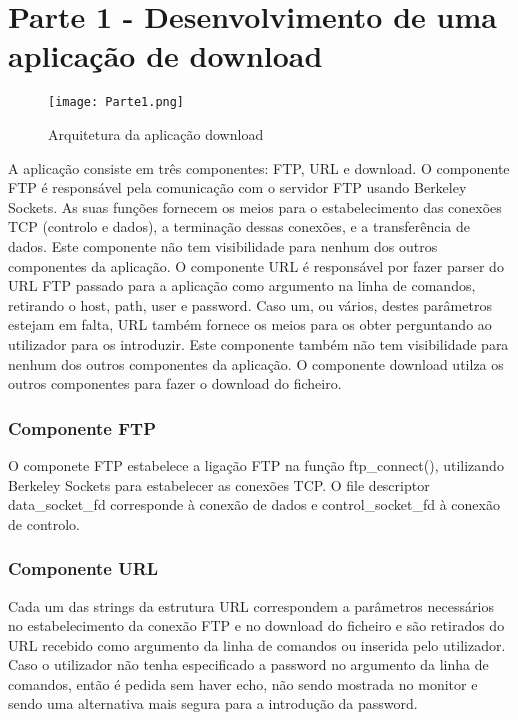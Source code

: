 \documentclass[a4paper]{article}
\begin{document}
\section{Parte 1 - Desenvolvimento de uma aplicação de download}

\begin{figure}[h]
    \centering
    \texttt{[image: Parte1.png]}
    \caption{Arquitetura da aplicação download}
\end{figure}


A aplicação consiste em três componentes: FTP, URL e download.
O componente FTP é responsável pela comunicação com o servidor FTP usando Berkeley Sockets. As suas funções fornecem os meios para o estabelecimento das conexões TCP (controlo e dados), a terminação dessas conexões, e a transferência de dados. Este componente não tem visibilidade para nenhum dos outros componentes da aplicação.
O componente URL é responsável por fazer parser do URL FTP passado para a aplicação como argumento na linha de comandos, retirando o host, path, user e password. Caso um, ou vários, destes parâmetros estejam em falta, URL também fornece os meios para os obter perguntando ao utilizador para os introduzir. Este componente também não tem visibilidade para nenhum dos outros componentes da aplicação.
O componente download utilza os outros componentes para fazer o download do ficheiro.

\subsubsection{Componente FTP}
O componete FTP estabelece a ligação FTP na função ftp\_connect(), utilizando Berkeley Sockets para estabelecer as conexões TCP. O file descriptor data\_socket\_fd corresponde à conexão de dados e control\_socket\_fd à conexão de controlo.

\subsubsection{Componente URL}
Cada um das strings da estrutura URL correspondem a parâmetros necessários no estabelecimento da conexão FTP e no download do ficheiro e são retirados do URL recebido como argumento da linha de comandos ou inserida pelo utilizador. Caso o utilizador não tenha especificado a password no argumento da linha de comandos, então é pedida sem haver echo, não sendo mostrada no monitor e sendo uma alternativa mais segura para a introdução da password.
\end{document}
